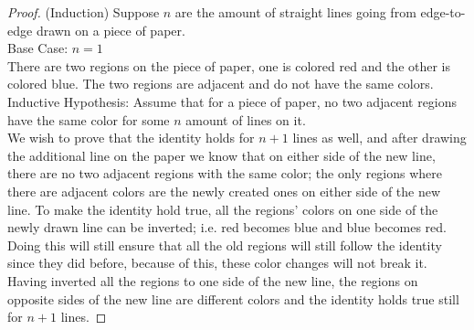 \documentclass[11pt]{article}
\begin{document}
\begin{proof}
	(Induction) Suppose $n$ are the amount of straight lines going from edge-to-edge drawn on a piece of paper.\\
	Base Case: $n=1$\\
	There are two regions on the piece of paper, one is colored red and the other is colored blue. The two regions are adjacent and do not have the same colors.\\
	Inductive Hypothesis: Assume that for a piece of paper, no two adjacent regions have the same color for some $n$ amount of lines on it. \\
	We wish to prove that the identity holds for $n+1$ lines as well, and after drawing the additional line on the paper we know that on either side of the new line, there are no two adjacent regions with the same color; the only regions where there are adjacent colors are the newly created ones on either side of the new line. To make the identity hold true, all the regions' colors on one side of the newly drawn line can be inverted; i.e. red becomes blue and blue becomes red. Doing this will still ensure that all the old regions will still follow the identity since they did before, because of this, these color changes will not break it. \\
	Having inverted all the regions to one side of the new line, the regions on opposite sides of the new line are different colors and the identity holds true still for $n+1$ lines.
\end{proof}











	
\end{document}
